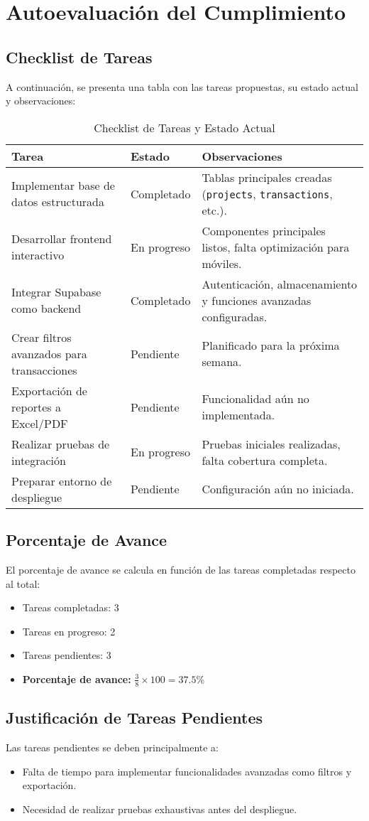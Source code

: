 \section{Autoevaluación del Cumplimiento}

\subsection{Checklist de Tareas}
A continuación, se presenta una tabla con las tareas propuestas, su estado actual y observaciones:

\begin{table}[H]
\centering
\begin{tabular}{|p{5cm}|p{3cm}|p{6cm}|}
\hline
\textbf{Tarea} & \textbf{Estado} & \textbf{Observaciones} \\ \hline
Implementar base de datos estructurada & Completado & Tablas principales creadas (\texttt{projects}, \texttt{transactions}, etc.). \\ \hline
Desarrollar frontend interactivo & En progreso & Componentes principales listos, falta optimización para móviles. \\ \hline
Integrar Supabase como backend & Completado & Autenticación, almacenamiento y funciones avanzadas configuradas. \\ \hline
Crear filtros avanzados para transacciones & Pendiente & Planificado para la próxima semana. \\ \hline
Exportación de reportes a Excel/PDF & Pendiente & Funcionalidad aún no implementada. \\ \hline
Realizar pruebas de integración & En progreso & Pruebas iniciales realizadas, falta cobertura completa. \\ \hline
Preparar entorno de despliegue & Pendiente & Configuración aún no iniciada. \\ \hline
\end{tabular}
\caption{Checklist de Tareas y Estado Actual}
\end{table}

\subsection{Porcentaje de Avance}
El porcentaje de avance se calcula en función de las tareas completadas respecto al total:
\begin{itemize}
    \item Tareas completadas: 3
    \item Tareas en progreso: 2
    \item Tareas pendientes: 3
    \item \textbf{Porcentaje de avance:} \( \frac{3}{8} \times 100 = 37.5\% \)
\end{itemize}

\subsection{Justificación de Tareas Pendientes}
Las tareas pendientes se deben principalmente a:
\begin{itemize}
    \item Falta de tiempo para implementar funcionalidades avanzadas como filtros y exportación.
    \item Necesidad de realizar pruebas exhaustivas antes del despliegue.
\end{itemize}